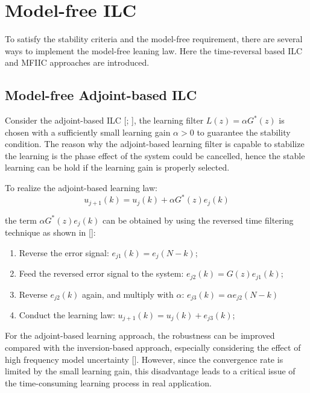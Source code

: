 \documentclass[a4paper, 12pt, twoside, openright]{mythesis}
\begin{document}
\section{Model-free ILC}
\label{sec: Model-free ILC}
To satisfy the stability criteria and the model-free requirement, there are several ways to implement the model-free leaning law. Here the time-reversal based ILC and MFIIC approaches are introduced.



\subsection{Model-free Adjoint-based ILC}
\label{sec: Model-free Adjoint-based ILC}

Consider the adjoint-based ILC [\cite{ye2005zero}; \cite{owens2009robust}], the learning filter $L(z)=\alpha G^{*}(z)$ is chosen with a sufficiently small learning gain $\alpha>0$ to guarantee the stability condition. The reason why the adjoint-based learning filter is capable to stabilize the learning is the phase effect of the system could be cancelled, hence the stable learning can be hold if the learning gain is properly selected.

To realize the adjoint-based learning law:
\begin{equation}
u_{j+1}(k)= u_{j}(k)+ \alpha G^{*}(z)e_{j} (k)
\label{eq:TimeRever}
\end{equation}

the term $\alpha G^{*}(z)e_{j} (k)$ can be obtained by using the reversed time filtering technique as shown in [\cite{ye2005zero}]:

\begin{enumerate}
  \item Reverse the error signal: $e_{j1}(k)=e_{j}(N-k)$;
  \item Feed the reversed error signal to the system: $e_{j2}(k)=G(z)e_{j1}(k)$;
  \item Reverse $e_{j2}(k)$ again, and multiply with $\alpha$:  $e_{j3}(k)= \alpha e_{j2}(N-k)$
  \item Conduct the learning law: $u_{j+1}(k)=u_{j}(k)+e_{j3}(k)$;
\end{enumerate}

For the adjoint-based learning approach, the robustness can be improved compared with the inversion-based approach, especially considering the effect of high frequency model uncertainty [\cite{owens2009robust}]. However, since the convergence rate is limited by the small learning gain, this disadvantage leads to a critical issue of the time-consuming learning process in real application.
\end{document}
